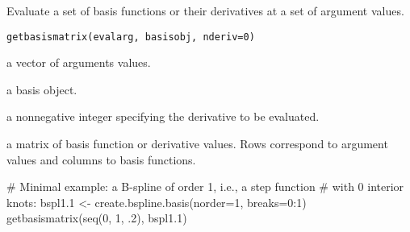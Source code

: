 \begin{Description}\relax
Evaluate a set of basis functions or their derivatives at
a set of argument values.
\end{Description}
\begin{Usage}
\begin{verbatim}
getbasismatrix(evalarg, basisobj, nderiv=0)
\end{verbatim}
\end{Usage}
\begin{Arguments}
\begin{ldescription}
\item[\code{evalarg}] a vector of arguments values.

\item[\code{basisobj}] a basis object.

\item[\code{nderiv}] a nonnegative integer specifying the derivative to be evaluated.

\end{ldescription}
\end{Arguments}
\begin{Value}
a matrix of basis function or derivative values.  Rows correspond
to argument values and columns to basis functions.
\end{Value}
\begin{SeeAlso}\relax
{}
\end{SeeAlso}
\begin{Examples}
\begin{ExampleCode}
# Minimal example:  a B-spline of order 1, i.e., a step function
# with 0 interior knots:
bspl1.1 <- create.bspline.basis(norder=1, breaks=0:1)
getbasismatrix(seq(0, 1, .2), bspl1.1)

\end{ExampleCode}
\end{Examples}

